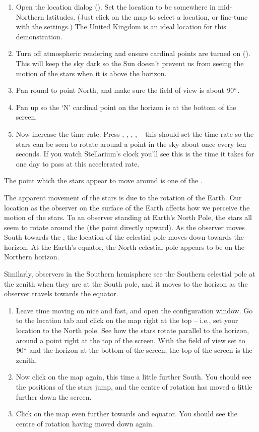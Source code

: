 \begin{enumerate}
\item Open the location dialog (). Set the location to be
  somewhere in mid-Northern latitudes. (Just click on the map to
  select a location, or fine-tune with the settings.) The United
  Kingdom is an ideal location for this demonstration.
\item Turn off atmospheric rendering  and ensure cardinal points are
  turned on (). This will keep the sky dark so the Sun doesn't prevent us
  from seeing the motion of the stars when it is above the horizon.
\item Pan round to point North, and make sure the field of view is
  about $90\degree$.
\item Pan up so the `N' cardinal point on the horizon is at the bottom
  of the screen.
\item Now increase the time rate. Press , , ,
  ,  -- this should set the time rate so the stars can
  be seen to rotate around a point in the sky about once every ten
  seconds. If you watch Stellarium's clock you'll see this is the time
  it takes for one day to pass at this accelerated rate.
\end{enumerate}

The point which the stars appear to move around is one of the
.

The apparent movement of the stars is due to the rotation of the Earth.
Our location as the observer on the surface of the Earth affects how we
perceive the motion of the stars. To an observer standing at Earth's
North Pole, the stars all seem to rotate around the  (the
point directly upward). As the observer moves South towards the ,
the location of the celestial pole moves down towards the horizon. At
the Earth's equator, the North celestial pole appears to be on the
Northern horizon.

Similarly, observers in the Southern hemisphere see the Southern
celestial pole at the zenith when they are at the South pole, and it
moves to the horizon as the observer travels towards the equator.

\begin{enumerate}
\item
  Leave time moving on nice and fast, and open the configuration window.
  Go to the location tab and click on the map right at the top -- i.e.,
  set your location to the North pole. See how the stars rotate parallel to the horizon, around a
  point right at the top of the screen. With the field of view set to
  $90\degree$ and the horizon at the bottom of the screen, the top of the screen
  is the zenith.
\item
  Now click on the map again, this time a little further South. You
  should see the positions of the stars jump, and the centre of rotation
  has moved a little further down the screen.
\item
  Click on the map even further towards and equator. You should see the
  centre of rotation having moved down again.
\end{enumerate}

